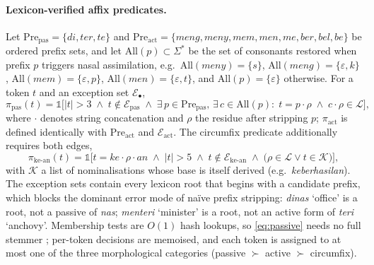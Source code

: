 \paragraph{Lexicon-verified affix predicates.}
Let $\mathrm{Pre}_{\text{pas}}=\{\textit{di},\textit{ter},\textit{te}\}$ and
$\mathrm{Pre}_{\text{act}}=\{\textit{meng},\textit{meny},\textit{mem},\textit{men},\textit{me},\textit{ber},\textit{bel},\textit{be}\}$
be ordered prefix sets, and let $\mathrm{All}(p)\subset\Sigma^{*}$ be the set of consonants restored when
prefix $p$ triggers nasal assimilation, e.g.\
$\mathrm{All}(\textit{meny})=\{s\}$, $\mathrm{All}(\textit{meng})=\{\varepsilon,k\}$,
$\mathrm{All}(\textit{mem})=\{\varepsilon,p\}$, $\mathrm{All}(\textit{men})=\{\varepsilon,t\}$, and
$\mathrm{All}(p)=\{\varepsilon\}$ otherwise. For a token $t$ and an exception set $\mathcal{E}_\bullet$,
\begin{equation}
\pi_{\text{pas}}(t)=\mathbb{1}\Big[|t|>3\;\wedge\;t\notin\mathcal{E}_{\text{pas}}\;\wedge\;
\exists\,p\in\mathrm{Pre}_{\text{pas}},\,\exists\,c\in\mathrm{All}(p):\;
t=p\!\cdot\!\rho\;\wedge\; c\!\cdot\!\rho\in\mathcal{L}\Big],
\label{eq:passive}
\end{equation}
where $\cdot$ denotes string concatenation and $\rho$ the residue after stripping $p$;
$\pi_{\text{act}}$ is defined identically with $\mathrm{Pre}_{\text{act}}$ and
$\mathcal{E}_{\text{act}}$. The circumfix predicate additionally requires both edges,
\begin{equation}
\pi_{\text{ke-an}}(t)=\mathbb{1}\Big[t=\textit{ke}\!\cdot\!\rho\!\cdot\!\textit{an}\;\wedge\;|t|>5\;\wedge\;
t\notin\mathcal{E}_{\text{ke-an}}\;\wedge\;\big(\rho\in\mathcal{L}\vee t\in\mathcal{K}\big)\Big],
\end{equation}
with $\mathcal{K}$ a list of nominalisations whose base is itself derived (e.g.\ \emph{keberhasilan}).
The exception sets contain every lexicon root that begins with a candidate prefix, which blocks the
dominant error mode of naïve prefix stripping: \emph{dinas} `office' is a root, not a passive of
\emph{nas}; \emph{menteri} `minister' is a root, not an active form of \emph{teri} `anchovy'. Membership
tests are $O(1)$ hash lookups, so \eqref{eq:passive} needs no full stemmer
\citep{adriani2007stemming}; per-token decisions are memoised, and each token is assigned to at most one
of the three morphological categories (passive $\succ$ active $\succ$ circumfix).

